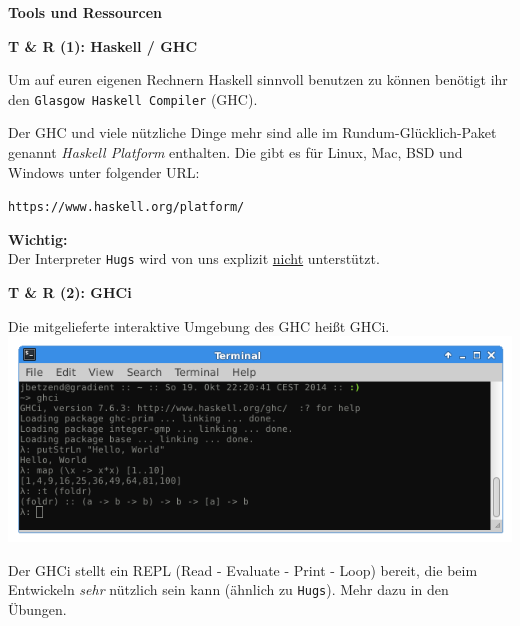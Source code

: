 \documentclass{beamer}
\begin{document}
  
  \begin{frame}

    \begin{center}
    \Large\textbf{Tools und Ressourcen}
    \end{center}
  \end{frame}
  
  
  \begin{frame}
    \begin{center}
    \Large\textbf{T \& R (1): Haskell / GHC}\\ \bigskip \normalsize
    
    Um auf euren eigenen Rechnern Haskell sinnvoll benutzen zu können benötigt ihr den \texttt{Glasgow Haskell Compiler} (GHC). \bigskip
    
    Der GHC und viele nützliche Dinge mehr sind alle im Rundum-Glücklich-Paket genannt \emph{Haskell Platform} enthalten. Die gibt es für Linux, Mac, BSD und Windows unter folgender URL:
    
    \bigskip\texttt{https://www.haskell.org/platform/}\smallskip
    
    \begin{important}
    \textbf{Wichtig:}\\ Der Interpreter \texttt{Hugs} wird von uns explizit \underline{nicht} unterstützt.
    \end{important}
    \end{center}
  \end{frame}
  
  
  \begin{frame}
    \begin{center}
    \Large\textbf{T \& R (2): GHCi}\\ \bigskip \normalsize
    
    Die mitgelieferte interaktive Umgebung des GHC heißt GHCi.\\\bigskip
    \includegraphics[scale=0.4]{ghci_example.png} 
    
    \bigskip Der GHCi stellt ein REPL (Read - Evaluate - Print - Loop) bereit, die beim Entwickeln \emph{sehr} nützlich sein kann (ähnlich zu \texttt{Hugs}). Mehr dazu in den Übungen.
    \end{center}
  \end{frame}
  
\end{document}
